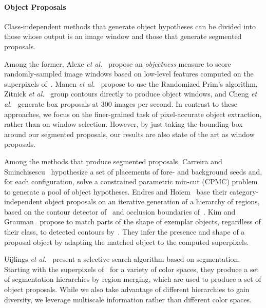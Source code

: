 \documentclass[10pt,journal,cspaper,compsoc]{IEEEtran}
\newcommand*{\etal}{\textit{et al.}\ }
\begin{document}
\paragraph*{\textbf{Object Proposals}} Class-independent methods that generate object hypotheses can be divided into those whose output is an image window
and those that generate segmented proposals.

Among the former, Alexe \etal \cite{Alexe2012} propose an \textit{objectness} measure to score randomly-sampled image
windows based on low-level features computed on the superpixels of~\cite{Felzenszwalb2004}.
%
Manen \etal \cite{Manen2013} propose to use the Randomized Prim's algorithm, Zitnick \etal \cite{Zitnick2014} group contours directly to produce object windows,
and Cheng \etal \cite{Cheng2014} generate box proposals at 300 images per second.   
In contrast to these approaches, we focus on the finer-grained task of pixel-accurate object extraction, rather than on window selection. However, by just taking the bounding box around our segmented proposals, our results
 are also state of the art as window proposals.  

Among the methods that produce segmented proposals, Carreira and Sminchisescu~\cite{Carreira2012b} hypothesize a set of placements of fore- and background seeds and,
for each configuration, solve a constrained parametric min-cut (CPMC) problem to generate a pool of object hypotheses.
Endres and Hoiem~\cite{Endres2014} base their category-independent object proposals on an iterative generation of a hierarchy of regions,
based on the contour detector of~\cite{Arbelaez2011} and occlusion boundaries of~\cite{Hoiem2011}.
Kim and Grauman~\cite{Kim2012} propose to match parts of the shape of exemplar objects, regardless of their class,
to detected contours by~\cite{Arbelaez2011}. 
They infer the presence and shape of a proposal object by adapting the matched object to the computed superpixels.

Uijlings \etal \cite{Uijlings2013} present a selective search algorithm based on segmentation.
Starting with the superpixels of~\cite{Felzenszwalb2004} for a variety of color spaces,
they produce a set of segmentation hierarchies by region merging, which are used
to produce a set of object proposals. 
While we also take advantage of different hierarchies to gain diversity, we leverage multiscale information rather than different color spaces.
\end{document}
